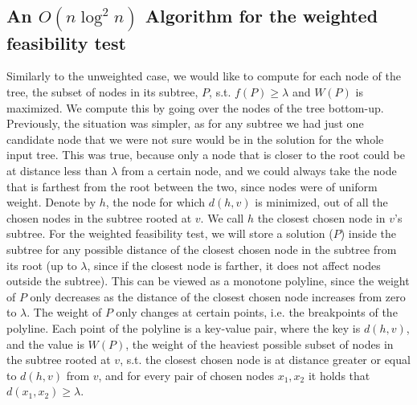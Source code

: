 \documentclass[11pt,a4paper]{article}
\theoremstyle{definition}
\theoremstyle{remark}
\begin{document}
\subsection{An \boldmath$O(n \log ^2 n)$ Algorithm for the weighted feasibility test}
Similarly to the unweighted case, we would like to compute for each node of the tree, the subset of nodes in its subtree, $P$, s.t. $f(P) \geq \lambda$ and $W(P)$ is maximized. We compute this by going over the nodes of the tree bottom-up. Previously, the situation was simpler, as for any subtree we had just one candidate node that we were not sure would be in the solution for the whole input tree. This was true, because only a node that is closer to the root could be at distance less than $\lambda$ from a certain node, and we could always take the node that is farthest from the root between the two, since nodes were of uniform weight.
Denote by $h$, the node for which $d(h,v)$ is minimized, out of all the chosen nodes in the subtree rooted at $v$. We call $h$ the closest chosen node in $v$'s subtree. For the weighted feasibility test, we will store a solution ($P$) inside the subtree for any possible distance of the closest chosen node in the subtree from its root (up to $\lambda$, since if the closest node is farther, it does not affect nodes outside the subtree). This can be viewed as a monotone polyline, since the weight of $P$ only decreases as the distance of the closest chosen node increases from zero to $\lambda$. The weight of $P$ only changes at certain points, i.e. the breakpoints of the polyline. Each point of the polyline is a key-value pair, where the key is $d(h,v)$, and the value is $W(P)$, the weight of the heaviest possible subset of nodes in the subtree rooted at $v$, s.t. the closest chosen node is at distance greater or equal to $d(h,v)$ from $v$, and for every pair of chosen nodes $x_1,x_2$ it holds that $d(x_1,x_2) \geq \lambda$.
\end{document}
